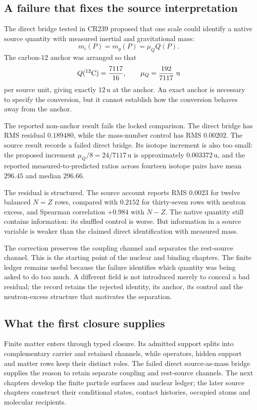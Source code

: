 \subsection{A failure that fixes the source interpretation}

The direct bridge tested in CR239 proposed that one scale could identify a native source quantity with measured inertial and gravitational mass:
\begin{equation}
m_i(P)=m_g(P)=\mu_QQ(P).
\end{equation}
The carbon-12 anchor was arranged so that
\begin{equation}
Q(^{12}{\rm C})=\frac{7117}{16},\qquad
\mu_Q=\frac{192}{7117}\ \mathrm u
\end{equation}
per source unit, giving exactly $12\,\mathrm u$ at the anchor. An exact anchor is necessary to specify the conversion, but it cannot establish how the conversion behaves away from the anchor.

The reported non-anchor result fails the locked comparison. The direct bridge has RMS residual $0.189480$, while the mass-number control has RMS $0.00202$. The source result records a failed direct bridge. Its isotope increment is also too small: the proposed increment $\mu_Q/8=24/7117\,\mathrm u$ is approximately $0.003372\,\mathrm u$, and the reported measured-to-predicted ratios across fourteen isotope pairs have mean $296.45$ and median $296.66$.\cite{viireview}

The residual is structured. The source account reports RMS $0.0023$ for twelve balanced $N=Z$ rows, compared with $0.2152$ for thirty-seven rows with neutron excess, and Spearman correlation $+0.984$ with $N-Z$. The native quantity still contains information: its shuffled control is worse. But information in a source variable is weaker than the claimed direct identification with measured mass.

The correction preserves the coupling channel and separates the rest-source channel. This is the starting point of the nuclear and binding chapters. The finite ledger remains useful because the failure identifies which quantity was being asked to do too much. A different field is not introduced merely to conceal a bad residual; the record retains the rejected identity, its anchor, its control and the neutron-excess structure that motivates the separation.

\subsection{What the first closure supplies}

Finite matter enters through typed closure. Its admitted support splits into complementary carrier and retained channels, while operators, hidden support and matter rows keep their distinct roles. The failed direct source-as-mass bridge supplies the reason to retain separate coupling and rest-source channels. The next chapters develop the finite particle surfaces and nuclear ledger; the later source chapters construct their conditional states, contact histories, occupied atoms and molecular recipients.

